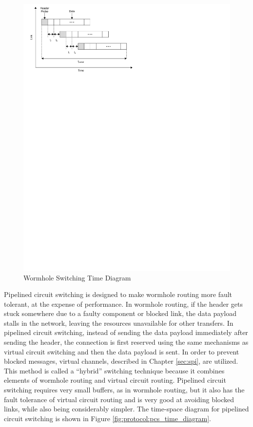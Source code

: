 \begin{figure}[ptb]
	\begin{centering}
		\includegraphics[scale=0.8]{Protocol/Figures/protocol-ws_time_diagram.pdf}
		\caption[Wormhole Switching Time Diagram]{Wormhole Switching Time Diagram \cite{ref:1997-duato-interconnection_networks}}
		\label{fig:protocol:ws_time_diagram}
	\end{centering}
\end{figure}

Pipelined circuit switching is designed to make wormhole routing more fault tolerant, at the expense of performance. In wormhole routing, if the header gets stuck somewhere due to a faulty component or blocked link, the data payload stalls in the network, leaving the resources unavailable for other transfers. In pipelined circuit switching, instead of sending the data payload immediately after sending the header, the connection is first reserved using the same mechanisms as virtual circuit switching and then the data payload is sent. In order to prevent blocked messages, virtual channels, described in Chapter \ref{sec:spi}, are utilized. This method is called a ``hybrid'' switching technique because it combines elements of wormhole routing and virtual circuit routing. Pipelined circuit switching requires very small buffers, as in wormhole routing, but it also has the fault tolerance of virtual circuit routing and is very good at avoiding blocked links, while also being considerably simpler. The time-space diagram for pipelined circuit switching is shown in Figure \ref{fig:protocol:pcs_time_diagram}. \cite{ref:1997-duato-interconnection_networks}

